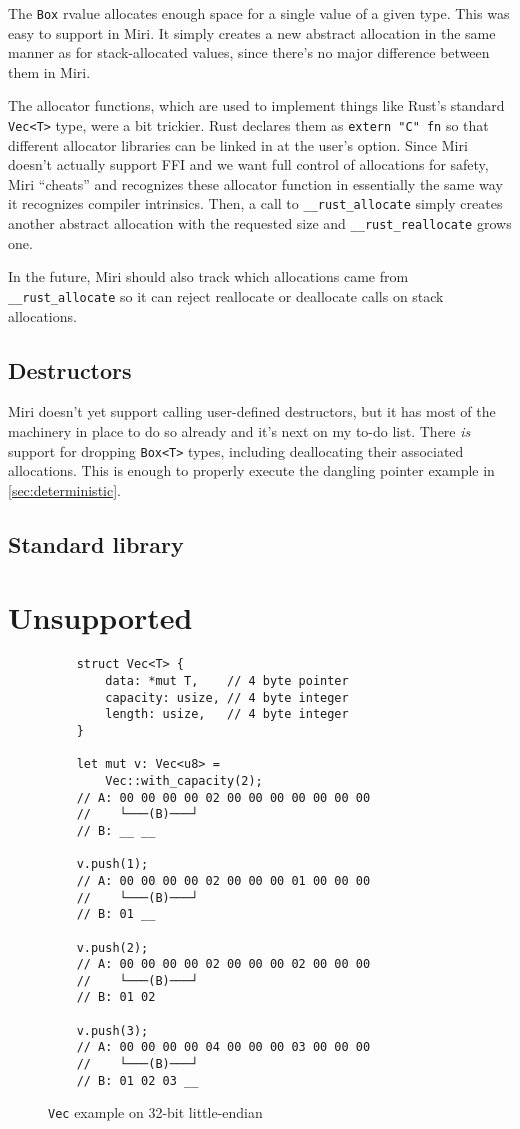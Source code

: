 \documentclass[twocolumn]{article}
\newcommand{\rust}[1]{\texttt{#1}}
\begin{document}
The \rust{Box} rvalue allocates enough space for a single value of a given type. This was easy to
support in Miri. It simply creates a new abstract allocation in the same manner as for
stack-allocated values, since there's no major difference between them in Miri.

The allocator functions, which are used to implement things like Rust's standard \rust{Vec<T>} type,
were a bit trickier. Rust declares them as \rust{extern "C" fn} so that different allocator
libraries can be linked in at the user's option. Since Miri doesn't actually support FFI and we want
full control of allocations for safety, Miri ``cheats'' and recognizes these allocator function in
essentially the same way it recognizes compiler intrinsics. Then, a call to \rust{__rust_allocate}
simply creates another abstract allocation with the requested size and \rust{__rust_reallocate}
grows one.

In the future, Miri should also track which allocations came from \rust{__rust_allocate} so it can
reject reallocate or deallocate calls on stack allocations.

\subsection{Destructors}

Miri doesn't yet support calling user-defined destructors, but it has most of the machinery in place
to do so already and it's next on my to-do list. There \emph{is} support for dropping \rust{Box<T>}
types, including deallocating their associated allocations. This is enough to properly execute the
dangling pointer example in \autoref{sec:deterministic}.

\subsection{Standard library}
\blindtext

\section{Unsupported}
\blindtext

\begin{figure}[t]
  \begin{verbatim}
    struct Vec<T> {
        data: *mut T,    // 4 byte pointer
        capacity: usize, // 4 byte integer
        length: usize,   // 4 byte integer
    }

    let mut v: Vec<u8> =
        Vec::with_capacity(2);
    // A: 00 00 00 00 02 00 00 00 00 00 00 00
    //    └───(B)───┘
    // B: __ __

    v.push(1);
    // A: 00 00 00 00 02 00 00 00 01 00 00 00
    //    └───(B)───┘
    // B: 01 __

    v.push(2);
    // A: 00 00 00 00 02 00 00 00 02 00 00 00
    //    └───(B)───┘
    // B: 01 02

    v.push(3);
    // A: 00 00 00 00 04 00 00 00 03 00 00 00
    //    └───(B)───┘
    // B: 01 02 03 __
  \end{verbatim}
  \caption{\rust{Vec} example on 32-bit little-endian}
\end{figure}
\end{document}
